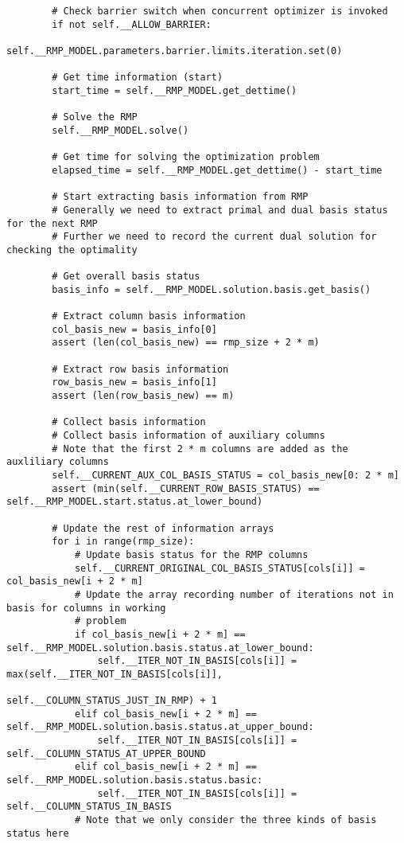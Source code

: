 \documentclass{article}
\begin{document}
\begin{lstlisting}
        # Check barrier switch when concurrent optimizer is invoked
        if not self.__ALLOW_BARRIER:
            self.__RMP_MODEL.parameters.barrier.limits.iteration.set(0)

        # Get time information (start)
        start_time = self.__RMP_MODEL.get_dettime()

        # Solve the RMP
        self.__RMP_MODEL.solve()

        # Get time for solving the optimization problem
        elapsed_time = self.__RMP_MODEL.get_dettime() - start_time

        # Start extracting basis information from RMP
        # Generally we need to extract primal and dual basis status for the next RMP
        # Further we need to record the current dual solution for checking the optimality

        # Get overall basis status
        basis_info = self.__RMP_MODEL.solution.basis.get_basis()

        # Extract column basis information
        col_basis_new = basis_info[0]
        assert (len(col_basis_new) == rmp_size + 2 * m)

        # Extract row basis information
        row_basis_new = basis_info[1]
        assert (len(row_basis_new) == m)

        # Collect basis information
        # Collect basis information of auxiliary columns
        # Note that the first 2 * m columns are added as the auxliliary columns
        self.__CURRENT_AUX_COL_BASIS_STATUS = col_basis_new[0: 2 * m]
        assert (min(self.__CURRENT_ROW_BASIS_STATUS) == self.__RMP_MODEL.start.status.at_lower_bound)

        # Update the rest of information arrays
        for i in range(rmp_size):
            # Update basis status for the RMP columns
            self.__CURRENT_ORIGINAL_COL_BASIS_STATUS[cols[i]] = col_basis_new[i + 2 * m]
            # Update the array recording number of iterations not in basis for columns in working 
            # problem
            if col_basis_new[i + 2 * m] == self.__RMP_MODEL.solution.basis.status.at_lower_bound:
                self.__ITER_NOT_IN_BASIS[cols[i]] = max(self.__ITER_NOT_IN_BASIS[cols[i]],
                                                        self.__COLUMN_STATUS_JUST_IN_RMP) + 1
            elif col_basis_new[i + 2 * m] == self.__RMP_MODEL.solution.basis.status.at_upper_bound:
                self.__ITER_NOT_IN_BASIS[cols[i]] = self.__COLUMN_STATUS_AT_UPPER_BOUND
            elif col_basis_new[i + 2 * m] == self.__RMP_MODEL.solution.basis.status.basic:
                self.__ITER_NOT_IN_BASIS[cols[i]] = self.__COLUMN_STATUS_IN_BASIS
            # Note that we only consider the three kinds of basis status here


\end{lstlisting}
\end{document}
